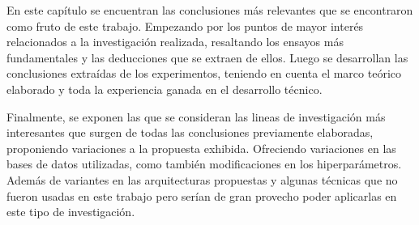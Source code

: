 \documentclass[spanish]{article}
\theoremstyle{definition}
\theoremstyle{remark}
\numberwithin{equation}{section}
\numberwithin{equation}{section} %
\begin{document}
En este capítulo se encuentran las conclusiones más relevantes que se encontraron como fruto de este trabajo. Empezando por los puntos de mayor interés relacionados a la investigación realizada, resaltando los ensayos más fundamentales y las deducciones que se extraen de ellos. Luego se desarrollan las conclusiones extraídas de los experimentos, teniendo en cuenta el marco teórico elaborado y toda la experiencia ganada en el desarrollo técnico. 
\par 
Finalmente, se exponen las que se consideran las lineas de investigación más interesantes que surgen de todas las conclusiones previamente elaboradas, proponiendo variaciones a la propuesta exhibida. Ofreciendo variaciones en las bases de datos utilizadas, como también modificaciones en los hiperparámetros. Además de variantes en las arquitecturas propuestas y algunas técnicas que no fueron usadas en este trabajo pero serían de gran provecho poder aplicarlas en este tipo de investigación.      



\clearpage
\end{document}
